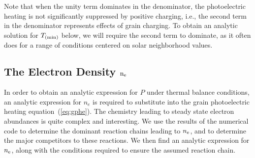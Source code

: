 \documentclass[12pt,preprint,flushrt]{aastex}
\newcommand{\tmin}{T_{\rm (min)}}
\begin{document}
Note that when the unity term dominates in the denominator, the photoelectric
heating is not significantly suppressed by positive charging, i.e., the
second term in the denominator represents effects of grain charging. To obtain
an analytic solution for $\tmin$ below, we will require the second term
to dominate, as it often does for a range of conditions centered on solar
neighborhood values.

\subsection{The Electron Density ${\rm n_e}$}

In order to obtain an analytic expression for $P$ under thermal
balance conditions, an analytic expression for $n_e$ is required
to substitute into the grain photoelectric heating equation~(\ref{eq:gphe}).
The chemistry leading to steady state electron abundances is quite
complex and interesting. We use the results of the numerical code
to determine the dominant reaction chains leading to $n_{\rm e}$, and
to determine the major competitors to these reactions. We then find
an analytic expression for $n_{\rm e}$, along with the conditions
required to ensure the assumed reaction chain.
\end{document}

